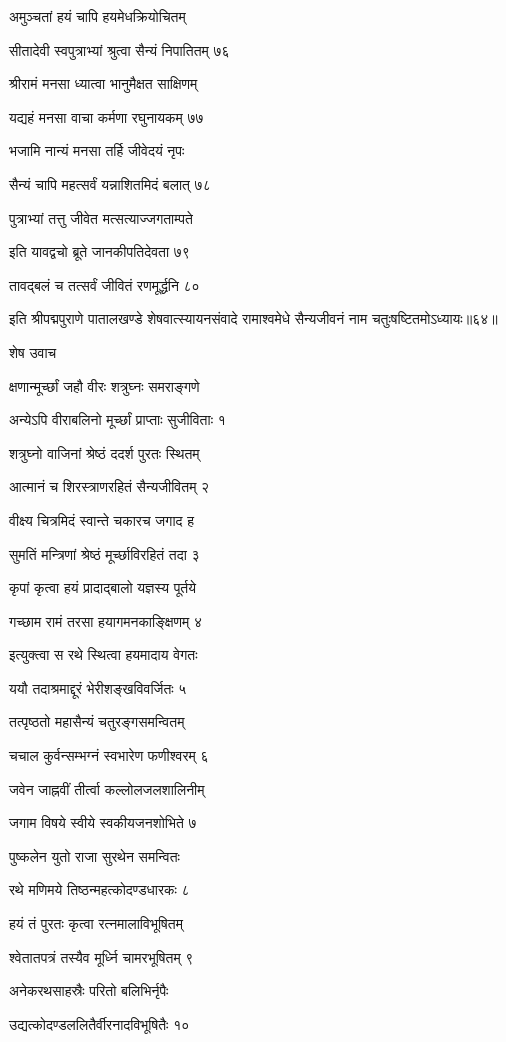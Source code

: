 अमुञ्चतां हयं चापि हयमेधक्रियोचितम्

सीतादेवी स्वपुत्राभ्यां श्रुत्वा सैन्यं निपातितम् ७६

श्रीरामं मनसा ध्यात्वा भानुमैक्षत साक्षिणम्

यद्यहं मनसा वाचा कर्मणा रघुनायकम् ७७

भजामि नान्यं मनसा तर्हि जीवेदयं नृपः

सैन्यं चापि महत्सर्वं यन्नाशितमिदं बलात् ७८

पुत्राभ्यां तत्तु जीवेत मत्सत्याज्जगताम्पते

इति यावद्वचो ब्रूते जानकीपतिदेवता ७९

तावद्बलं च तत्सर्वं जीवितं रणमूर्द्धनि ८०

इति श्रीपद्मपुराणे पातालखण्डे शेषवात्स्यायनसंवादे रामाश्वमेधे सैन्यजीवनं नाम चतुःषष्टितमोऽध्यायः॥६४॥


शेष उवाच

क्षणान्मूर्च्छां जहौ वीरः शत्रुघ्नः समराङ्गणे

अन्येऽपि वीराबलिनो मूर्च्छां प्राप्ताः सुजीविताः १

शत्रुघ्नो वाजिनां श्रेष्ठं ददर्श पुरतः स्थितम्

आत्मानं च शिरस्त्राणरहितं सैन्यजीवितम् २

वीक्ष्य चित्रमिदं स्वान्ते चकारच जगाद ह

सुमतिं मन्त्रिणां श्रेष्ठं मूर्च्छाविरहितं तदा ३

कृपां कृत्वा हयं प्रादाद्बालो यज्ञस्य पूर्तये

गच्छाम रामं तरसा हयागमनकाङ्क्षिणम् ४

इत्युक्त्वा स रथे स्थित्वा हयमादाय वेगतः

ययौ तदाश्रमाद्दूरं भेरीशङ्खविवर्जितः ५

तत्पृष्ठतो महासैन्यं चतुरङ्गसमन्वितम्

चचाल कुर्वन्सम्भग्नं स्वभारेण फणीश्वरम् ६

जवेन जाह्नवीं तीर्त्वा कल्लोलजलशालिनीम्

जगाम विषये स्वीये स्वकीयजनशोभिते ७

पुष्कलेन युतो राजा सुरथेन समन्वितः

रथे मणिमये तिष्ठन्महत्कोदण्डधारकः ८

हयं तं पुरतः कृत्वा रत्नमालाविभूषितम्

श्वेतातपत्रं तस्यैव मूर्ध्नि चामरभूषितम् ९

अनेकरथसाहस्रैः परितो बलिभिर्नृपैः

उद्यत्कोदण्डललितैर्वीरनादविभूषितैः १०

